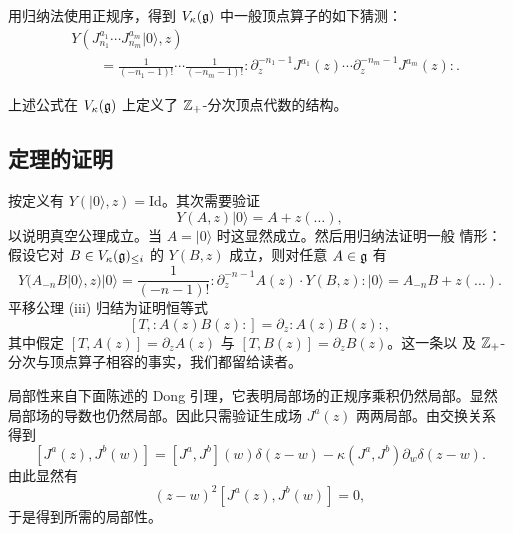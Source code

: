 用归纳法使用正规序，得到 $V_\kappa(\mathfrak{g})$ 中一般顶点算子的如下猜测：
\begin{equation}
    \begin{aligned}
        &Y(J^{a_1}_{n_1}\cdots J^{a_m}_{n_m}|0\rangle,z)\\
        &\qquad=\frac{1}{(-n_1-1)!}\cdots\frac{1}{(-n_m-1)!}
        :\!\partial_z^{-n_1-1}J^{a_1}(z)\cdots
        \partial_z^{-n_m-1}J^{a_m}(z)\!:.
    \end{aligned}
    \tag{2.2-8}
\end{equation}
\renewcommand{\thetheorem}{2.2.2}
\begin{theorem}
    上述公式在 $V_\kappa(\mathfrak{g})$ 上定义了 $\mathbb{Z}_+$-分次顶点代数的结构。
\end{theorem}

\subsection{定理的证明}

按定义有 $Y(|0\rangle,z)=\mathrm{Id}$。其次需要验证
\[
    Y(A,z)|0\rangle=A+z(\dots),
\]
以说明真空公理成立。当 $A=|0\rangle$ 时这显然成立。然后用归纳法证明一般
情形：假设它对 $B\in V_\kappa(\mathfrak{g})_{\le i}$ 的 $Y(B,z)$ 成立，则对任意
$A\in\mathfrak{g}$ 有
\[
    Y(A_{-n}B|0\rangle,z)|0\rangle
    =\frac{1}{(-n-1)!}:\!\partial_z^{-n-1}A(z)\cdot Y(B,z)\!:|0\rangle
    =A_{-n}B+z(\dots).
\]
平移公理 (iii) 归结为证明恒等式
\[
    [T,:\!A(z)B(z)\!:]=\partial_z:\!A(z)B(z)\!:,
\]
其中假定 $[T,A(z)]=\partial_zA(z)$ 与 $[T,B(z)]=\partial_zB(z)$。这一条以
及 $\mathbb{Z}_+$-分次与顶点算子相容的事实，我们都留给读者。

局部性来自下面陈述的 Dong 引理，它表明局部场的正规序乘积仍然局部。显然
局部场的导数也仍然局部。因此只需验证生成场 $J^a(z)$ 两两局部。由交换关系
得到
\[
    \left[J^a(z),J^b(w)\right]
    =\left[J^a,J^b\right](w)\delta(z-w)
    -\kappa(J^a,J^b)\partial_w\delta(z-w).
\]
由此显然有
\[
    (z-w)^2\left[J^a(z),J^b(w)\right]=0,
\]
于是得到所需的局部性。

